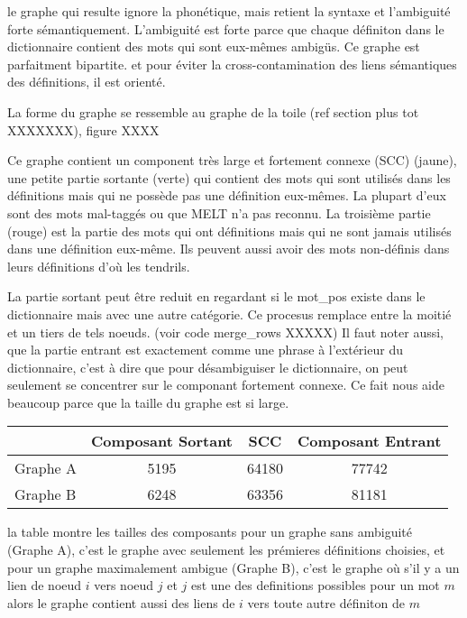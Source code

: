 le graphe qui resulte ignore la phonétique, mais retient la syntaxe et
l'ambiguité forte sémantiquement. L'ambiguité est forte parce que chaque
définiton dans le dictionnaire contient des mots qui sont eux-mêmes
ambigüs. Ce graphe est parfaitment bipartite.
et pour éviter la cross-contamination des liens sémantiques des
définitions, il est orienté. 

La forme du graphe se ressemble au graphe de la toile (ref section plus tot
XXXXXXX), figure XXXX

\begin{figure}
\centering
\parbox{5cm}{
\def\svgscale{0.5}

\caption{}
\label{fig:graph_shocker}}
\end{figure}

Ce graphe contient un component très large et fortement connexe (SCC) (jaune),
une petite partie sortante (verte) qui contient des mots qui sont
utilisés dans les définitions mais qui ne possède pas une définition
eux-mêmes. La plupart d'eux sont des mots mal-taggés ou que MELT n'a
pas reconnu. La troisième partie (rouge) est la partie des mots qui
ont définitions mais qui ne sont jamais utilisés dans une définition
eux-même. Ils peuvent aussi avoir des mots non-définis dans leurs
définitions d'où les tendrils.

La partie sortant peut être reduit en regardant si le mot\_pos existe
dans le dictionnaire mais avec une autre catégorie. Ce procesus remplace
entre la moitié et un tiers de tels noeuds. (voir code merge\_rows XXXXX)
Il faut noter aussi, que la partie entrant est exactement comme une
phrase à l'extérieur du dictionnaire, c'est à dire que pour désambiguiser
le dictionnaire, on peut seulement se concentrer sur le componant
fortement connexe. Ce fait nous aide beaucoup parce que la taille du
graphe est si large.

\begin{tabular}{|l|c|c|c|}
\hline
             & Composant Sortant & SCC   & Composant Entrant \\
\hline
Graphe A     &  5195             & 64180 &  77742            \\
\hline
Graphe B     &  6248             & 63356 &  81181             \\
\hline
\end{tabular}


la table montre les tailles des composants pour un graphe sans ambiguité
(Graphe A), c'est le graphe avec seulement les prémieres définitions
choisies, et pour un graphe maximalement ambigue (Graphe B), c'est le graphe
où s'il y a un lien de noeud $i$ vers noeud $j$ et $j$ est une des
definitions possibles pour un mot $m$ alors le graphe contient aussi des
liens de $i$ vers toute autre définiton de $m$

